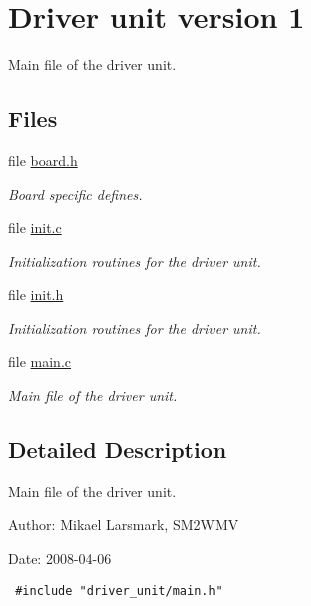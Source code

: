 \hypertarget{group__driver__unit__group}{
\section{Driver unit version 1}
\label{group__driver__unit__group}
}
Main file of the driver unit.  


\subsection*{Files}
\begin{CompactItemize}
\item 
file \hyperlink{driver__unit_2board_8h}{board.h}
\begin{CompactList}\small\item\em Board specific defines. \item\end{CompactList}

\item 
file \hyperlink{driver__unit_2init_8c}{init.c}
\begin{CompactList}\small\item\em Initialization routines for the driver unit. \item\end{CompactList}

\item 
file \hyperlink{driver__unit_2init_8h}{init.h}
\begin{CompactList}\small\item\em Initialization routines for the driver unit. \item\end{CompactList}

\item 
file \hyperlink{driver__unit_2main_8c}{main.c}
\begin{CompactList}\small\item\em Main file of the driver unit. \item\end{CompactList}

\end{CompactItemize}


\subsection{Detailed Description}
Main file of the driver unit. 

\begin{Desc}
\item[Author:]Mikael Larsmark, SM2WMV \end{Desc}
\begin{Desc}
\item[Date:]2008-04-06 

\begin{Code}\begin{verbatim} #include "driver_unit/main.h" 
\end{verbatim}
\end{Code}

 \end{Desc}
